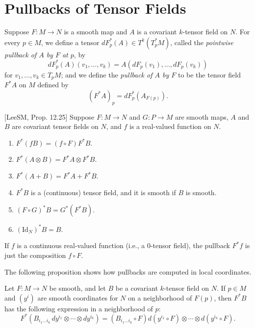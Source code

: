 \section{Pullbacks of Tensor Fields}

Suppose $F: M \to N$ is a smooth map and $A$ is a covariant $k$-tensor field on $N$. For every $p \in M$, we define a tensor $dF_p^*(A) \in T^k(T_p^* M)$, called the \emph{pointwise pullback of $A$ by $F$ at $p$}, by
\[
dF_p^*(A)(v_1, \ldots, v_k) = A(dF_p(v_1), \ldots, dF_p(v_k))
\]
for $v_1, \ldots, v_k \in T_p M$; and we define the \emph{pullback of $A$ by $F$} to be the tensor field $F^* A$ on $M$ defined by
\[
(F^* A)_p = dF_p^*(A_{F(p)}).
\]

\begin{proposition}
\label{prop:tensor-pullback-properties}

[LeeSM, Prop. 12.25] Suppose $F: M \to N$ and $G: P \to M$ are smooth maps, $A$ and $B$ are covariant tensor fields on $N$, and $f$ is a real-valued function on $N$.
\begin{enumerate}
\item[(a)] $F^*(fB) = (f \circ F) F^* B$.
\item[(b)] $F^*(A \otimes B) = F^* A \otimes F^* B$.
\item[(c)] $F^*(A + B) = F^* A + F^* B$.
\item[(d)] $F^* B$ is a (continuous) tensor field, and it is smooth if $B$ is smooth.
\item[(e)] $(F \circ G)^* B = G^*(F^* B)$.
\item[(f)] $(\text{Id}_N)^* B = B$.
\end{enumerate}
\end{proposition}

If $f$ is a continuous real-valued function (i.e., a 0-tensor field), the pullback $F^* f$ is just the composition $f \circ F$.

The following proposition shows how pullbacks are computed in local coordinates.

\begin{proposition}
\label{prop:pullback-computation-coordinates}

Let $F: M \to N$ be smooth, and let $B$ be a covariant $k$-tensor field on $N$. If $p \in M$ and $(y^i)$ are smooth coordinates for $N$ on a neighborhood of $F(p)$, then $F^* B$ has the following expression in a neighborhood of $p$:
\[
F^* \left( B_{i_1 \ldots i_k} \, dy^{i_1} \otimes \cdots \otimes dy^{i_k} \right) = \left( B_{i_1 \ldots i_k} \circ F \right) d(y^{i_1} \circ F) \otimes \cdots \otimes d(y^{i_k} \circ F).
\]
\end{proposition}

